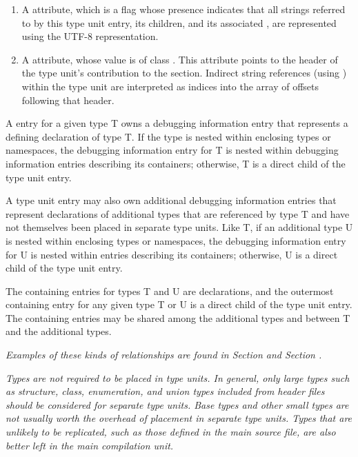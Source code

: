 \begin{enumerate}[1. ]
\item A \DWATuseUTFeight{} attribute, which is a flag
whose presence indicates that all strings referred to by this type
unit entry, its children, and its associated
,
are represented using the UTF-8 representation.

\item A
\bb
\DWATstroffsets{}
\eb
attribute, whose value is of class \CLASSstroffsetsptr.
This attribute points to the
\bb
header
\eb
of the type unit's contribution to
the \dotdebugstroffsets{} section. Indirect string references
(using \DWFORMstrxXNor) within the type unit are interpreted
as indices
\bb
into the array of offsets following that header.
\eb

\end{enumerate}

A  entry for a given type T owns a debugging
information entry that represents a defining declaration
of type T. If the type is nested within enclosing types or
namespaces, the debugging information entry for T is nested
within debugging information entries describing its containers;
otherwise, T is a direct child of the type unit entry.

A type unit entry may also own additional debugging information
entries that represent declarations of additional types that
are referenced by type T and have not themselves been placed in
separate type units. Like T, if an additional type U is nested
within enclosing types or namespaces, the debugging information
entry for U is nested within entries describing its containers;
otherwise, U is a direct child of the type unit entry.

The containing entries for types T and U are declarations,
and the outermost containing entry for any given type T or
U is a direct child of the type unit entry. The containing
entries may be shared among the additional types and between
T and the additional types.

\textit{Examples of these kinds of relationships are found in
Section  and
Section .}

\textit{Types are not required to be placed in type units. In general,
only large types such as structure, class, enumeration, and
union types included from header files should be considered
for separate type units. Base types and other small types
are not usually worth the overhead of placement in separate
type units. Types that are unlikely to be replicated, such
as those defined in the main source file, are also better
left in the main compilation unit.}

